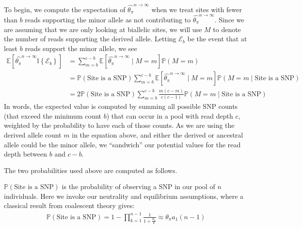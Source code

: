 \documentclass[letterpaper,fontsize=9pt,DIV=12]{scrartcl}
\newcommand{\samplesize}{n}
\newcommand{\readdepth}{c}
\newcommand{\thetapi}{\widehat{\theta_\pi}}
\begin{document}
To begin, we compute the expectation of $\thetapi^{\samplesize\to\infty}$ when we treat sites with fewer than $b$ reads supporting the minor allele as not contributing to $\thetapi^{\samplesize\to\infty}$.  Since we are assuming that we are only looking at biallelic sites, we will use $M$ to denote the number of reads supporting the derived allele.  Letting $\mathcal{E}_b$ be the event that at least $b$ reads support the minor allele, we see
%
\begin{align}
\mathbb{E}\left[\thetapi^{\samplesize\to\infty} \mathbb{I}\left\{\mathcal{E}_b\right\}\right] &= \sum_{m=b}^{\readdepth-b} \mathbb{E}\left[\thetapi^{\samplesize\to\infty} \mid M=m \right] \mathbb{P}(M = m)\\
&= \mathbb{P}\left(\text{Site is a SNP}\right)\sum_{m=b}^{\readdepth-b} \mathbb{E}\left[\thetapi^{\samplesize\to\infty} \mid M=m \right] \mathbb{P}\left(M = m \mid \text{Site is a SNP}\right)\\
&=  2\mathbb{P}\left(\text{Site is a SNP}\right)\sum_{m=b}^{\readdepth-b} \frac{m(\readdepth-m)}{\readdepth(\readdepth-1)} \mathbb{P}\left(M = m \mid \text{Site is a SNP}\right)
\label{eq:ExpectationThetaPi}
\end{align}
%
In words, the expected value is computed by summing all possible SNP counts (that exceed the minimum count $b$) that can occur in a pool with read depth $\readdepth$, weighted by the probability to have each of those counts.  As we are using the derived allele count $m$ in the equation above, and either the derived or ancestral allele could be the minor allele, we ``sandwich'' our potential values for the read depth between $b$ and $\readdepth-b$.

The two probabilities used above are computed as follows.

$\mathbb{P}\left(\text{Site is a SNP}\right)$ is the probability of observing a SNP in our pool of $\samplesize$ individuals.  Here we invoke our neutrality and equilibrium assumptions, where a classical result from coalescent theory gives:
%
\begin{align}
\label{eq:PSNP}
\mathbb{P}\left(\text{Site is a SNP}\right) = 1- \prod_{k=1}^{\samplesize-1} \frac{1}{1+\frac{\theta_\pi}{k}} \approx \theta_\pi a_1(n-1)
\end{align}
\end{document}
